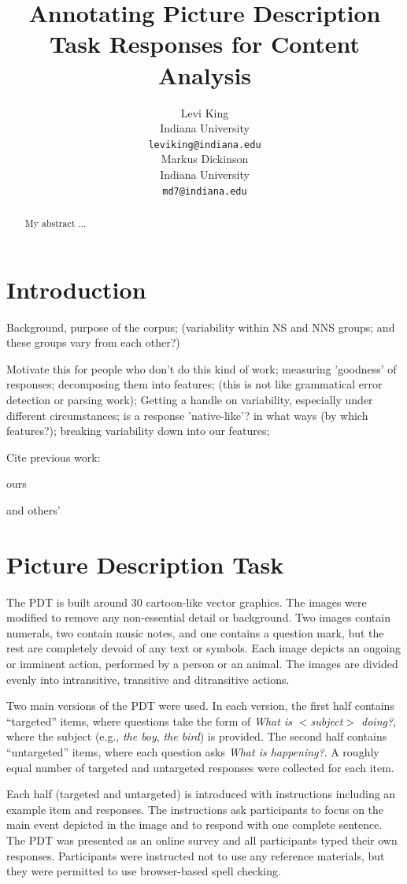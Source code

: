 \documentclass[11pt,a4paper]{article}
\title{Annotating Picture Description Task Responses for Content Analysis}
\author{Levi King \\
  Indiana University \\
  {\tt leviking@indiana.edu} \\\And
  Markus Dickinson \\
  Indiana University \\
  {\tt md7@indiana.edu} \\}
\date{}
\begin{document}
\maketitle
\begin{abstract}
My abstract ...

\end{abstract}


\section{Introduction}

Background, purpose of the corpus; (variability within NS and NNS groups; and these groups vary from each other?)

Motivate this for people who don't do this kind of work; measuring 'goodness' of responses; decomposing them into features; (this is not like grammatical error detection or parsing work); Getting a handle on variability, especially under different circumstances; is a response 'native-like'? in what ways (by which features?); breaking variability down into our features;


Cite previous work:

ours \citep{king:dickinson:13} 


and others' \citep{somasundaran:ea:15}

\section{Picture Description Task}

The PDT is built around 30 cartoon-like vector graphics. The images were modified to remove any non-essential detail or background. Two images contain numerals, two contain music notes, and one contains a question mark, but the rest are completely devoid of any text or symbols. Each image depicts an ongoing or imminent action, performed by a person or an animal. The images are divided evenly into intransitive, transitive and ditransitive actions. 

Two main versions of the PDT were used. In each version, the first half contains ``targeted'' items, where questions take the form of \textit{What is $<$subject$>$ doing?}, where the subject (e.g., \textit{the boy}, \textit{the bird}) is provided. The second half contains ``untargeted'' items, where each question asks \textit{What is happening?}. A roughly equal number of targeted and untargeted responses were collected for each item.

Each half (targeted and untargeted) is introduced with instructions including an example item and responses. The instructions ask participants to focus on the main event depicted in the image and to respond with one complete sentence. The PDT was presented as an online survey and all participants typed their own responses. Participants were instructed not to use any reference materials, but they were permitted to use browser-based spell checking.
\end{document}
